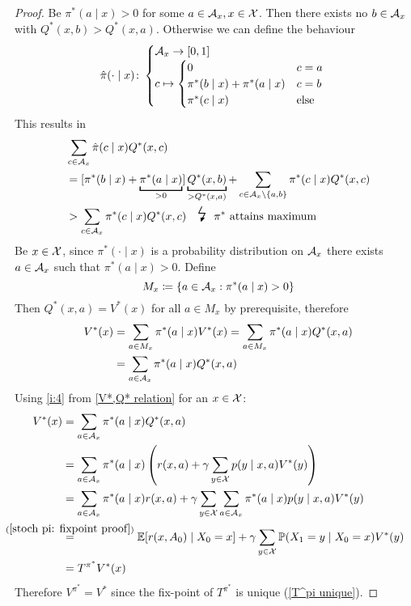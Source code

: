 \begin{proof}
	\xToy{\ref{ii:3}}{\ref{ii:4}} 
	Be \(\pi^*(a\mid x)>0\) for some \(a\in\mathcal{A}_x,x\in\mathcal{X}\). Then there exists no \(b\in\mathcal{A}_x\) with \(Q^*(x,b)>Q^*(x,a)\). Otherwise we can define the behaviour
	\[
		\hat{\pi}(\cdot\mid x)\colon
		\begin{cases}
			\mathcal{A}_x\to[0,1]\\
			c\mapsto 
			\begin{cases}
				0 & c=a \\
				\pi^*(b\mid x) + \pi^*(a\mid x) & c=b\\
				\pi^*(c\mid x) & \text{else}
			\end{cases}
		\end{cases}
	\]
	This results in
	\begin{align*}
		&\sum_{c\in\cA_x} \hat{\pi}(c\mid x) Q^*(x,c)\\
		&=[\pi^*(b\mid x) %
		+ \underbracket[1pt]{\pi^*(a\mid x)}_{>0}] \underbracket[1pt]{Q^*(x,b)}_{>Q^*(x,a)}
		+\sum_{c\in\cA_x\setminus \{a,b\}} \pi^*(c\mid x)Q^*(x,c)\\
		&> \sum_{c\in\cA_x} \pi^*(c\mid x) Q^*(x,c) \contradiction{\pi^* \text{ attains maximum}}
	\end{align*}
	\xToy{\ref{ii:4}}{\ref{ii:2}} Be \(x\in\mathcal{X}\), since \(\pi^*(\cdot\mid x)\) is a probability distribution on \(\mathcal{A}_x\) there exists \(a\in\mathcal{A}_x\) such that \(\pi^*(a\mid x)>0\). Define
	\[
		M_x\coloneqq \{a\in\mathcal{A}_x:\pi^*(a\mid x)>0 \}
	\]
	Then \(Q^*(x,a)=V^*(x)\) for all \(a\in M_x\) by prerequisite, therefore
	\begin{align*}
		V^*(x)&= \sum_{a\in M_x} \pi^*(a\mid x) V^*(x) 
		= \sum_{a\in M_x} \pi^*(a\mid x)Q^*(x,a)\\
		&=\sum_{a\in \mathcal{A}_x} \pi^*(a\mid x)Q^*(x,a)
	\end{align*}
	\xToy{\ref{ii:2}}{\ref{ii:1}} Using \ref{i:4} from \ref{V*,Q* relation} for an \(x\in\mathcal{X}\):
	\begin{align*}
		V^*(x)&=\sum_{a\in \cA_x} \pi^*(a\mid x)Q^*(x,a)\\
		&=\sum_{a\in \cA_x} \pi^*(a\mid x) 
		\left(r(x,a)+\gamma \sum\limits_{y\in\cX}p(y\mid x,a) V^*(y)\right)\\
		&=\sum_{a\in \cA_x}\pi^*(a\mid x)r(x,a)
		+\gamma \sum_{y\in\cX} \sum_{a\in\cA_x}\pi^*(a\mid x)p(y\mid x,a)V^*(y)\\
		&\lxeq{(\ref{stoch pi: fixpoint proof})}\E[r(x,A_0)\mid X_0=x] 
		+ \gamma \sum_{y\in\cX}\Pr(X_1=y\mid X_0 =x) V^*(y)\\
		&=T^{\pi^*} V^*(x)
	\end{align*}
	Therefore \(V^{\pi^*} = V^*\) since the fix-point of \(T^{\pi^*}\) is unique (\ref{T^pi unique}).
\end{proof}
